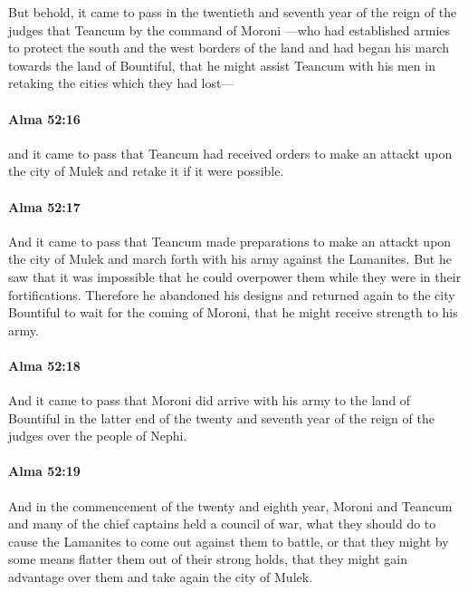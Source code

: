 			But behold, it came to pass
			in the twentieth and seventh year of the reign of the judges
			that Teancum by the command of Moroni
			---who had established armies to protect the south and the west borders of the land
			and had began his march towards the land of Bountiful,
			that he might assist Teancum with his men
			in retaking the cities which they had lost---

		\paragraph{Alma 52:16} %
			\label{ALMA-52-16}

			and it came to pass that Teancum had received orders
			to make an attackt upon the city of Mulek and retake it if it were possible.

		\paragraph{Alma 52:17} %
			\label{ALMA-52-17}

			And it came to pass that Teancum made preparations
			to make an attackt upon the city of Mulek
			and march forth with his army against the Lamanites.
			But he saw that it was impossible that he could overpower them
			while they were in their fortifications.
			Therefore he abandoned his designs
			and returned again to the city Bountiful
			to wait for the coming of Moroni,
			that he might receive strength to his army.

		\paragraph{Alma 52:18} %
			\label{ALMA-52-18}

			And it came to pass that
			Moroni did arrive with his army to the land of Bountiful
			in the latter end of the twenty and seventh year
			of the reign of the judges over the people of Nephi.

		\paragraph{Alma 52:19} %
			\label{ALMA-52-19}

			And in the commencement of the twenty and eighth year,
			Moroni and Teancum and many of the chief captains held a council of war,
			what they should do to cause the Lamanites to come out against them to battle,
			or that they might by some means flatter them out of their strong holds,
			that they might gain advantage over them and take again the city of Mulek.

